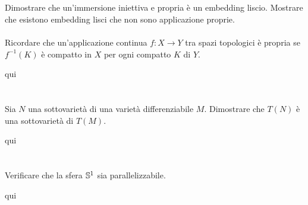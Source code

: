 \section{}\label{es2-24}

\begin{tcolorbox}
	Dimostrare che un'immersione iniettiva e propria è un embedding liscio. Mostrare che esistono embedding lisci che non sono applicazione proprie.\\\\
	Ricordare che un'applicazione continua $ f : X \to Y $ tra spazi topologici è propria se $ f^{-1}(K) $ è compatto in $ X $ per ogni compatto $ K $ di $ Y $.
\end{tcolorbox}

qui




%

\newpage

%

\section{}\label{es2-25}

\begin{tcolorbox}
	Sia $ N $ una sottovarietà di una varietà differenziabile $ M $. Dimostrare che $ T(N) $ è una sottovarietà di $ T(M) $.
\end{tcolorbox}

qui

%

\newpage

%

\section{}\label{BONUS2-4}

\begin{tcolorbox}
	Verificare che la sfera $ \S^{1} $ sia parallelizzabile.
\end{tcolorbox}

qui

%

\newpage

%

\section{}\label{es2-26}

